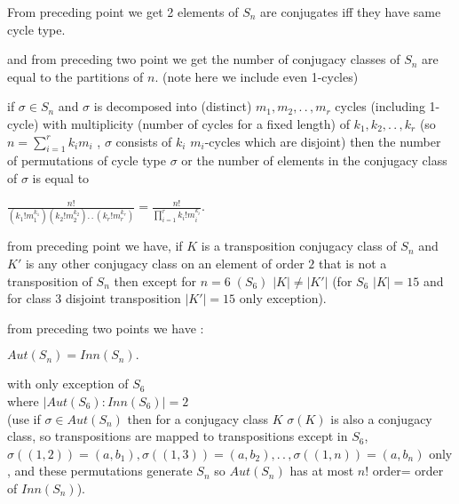 \documentclass[11pt]{extarticle}
\newcommand{\ck}{.\,.\,}
\newcommand{\tbx}[2][]{
	\begin{tcolorbox}[enhanced,breakable,size=small,colback=black!2!white,title={#1},arc is angular, arc=1.5mm,drop fuzzy shadow]
		#2
	\end{tcolorbox}
}
\begin{document}
\begin{multicols}{2}
	\tbx{From preceding point we get 2 elements of $ S_n $ are conjugates iff they have same cycle type.
	}
	\tbx{and from preceding two point we get the number of conjugacy classes of $ S_n $ are equal to the partitions of $ n .$ (note here we include even 1-cycles)
	}
	\tbx{if $ \sigma \in S_n $ and $ \sigma $ is decomposed into (distinct) $ m_1,m_2,\ck, m_r $ cycles (including 1-cycle) with multiplicity (number of cycles for a fixed length) of $ k_1,k_2,\ck , k_r $ 
		(so $ n= \sum_{i=1}^{r}k_im_i $ , $ \sigma $ consists of $ k_i $ $ m_i $-cycles which are disjoint) then the number of permutations of cycle type $ \sigma $ or the number of elements in the conjugacy class of $ \sigma $ is equal to 
		\begin{center}
			$ \frac{ n! }{(k_1!m_{1}^{k_1})(k_2!m_{2}^{k_2})\ck (k_r!m_{r}^{k_r})}=\frac{ n! }{\prod_{i=1}^{r}k_i!m_i^{k_i}} .$
		\end{center}
	}
	\tbx{from preceding point we have, if $ K $ is a transposition conjugacy class of $ S_n $ and $  K' $ is any other conjugacy class on an element of order $ 2 $ that is not a transposition of $ S_n $ then except for $ n=6 \; (S_6)$ $ |K|\neq |K'| $ (for $ S_6 $ $ |K|=15 $ and for class $ 3 $ disjoint transposition $ |K'|=15 $ only exception).
	}
		\tbx{from preceding two points we have :
		\begin{center}
			$ Aut(S_n)=Inn(S_n) .$
		\end{center} with only exception of $ S_6 $ \\ where $ |Aut(S_6):Inn(S_6)|=2 $ \\
		{ \footnotesize (use if $ \sigma \in Aut(S_n) $ then for a conjugacy class $ K $ $ \sigma(K) $ is also a conjugacy class, so transpositions are mapped to transpositions except in $ S_6 $, $ \sigma((1,2))=(a,b_1), \sigma((1,3))=(a,b_2),\ck, \sigma ((1,n))=(a,b_n)$ only , and these permutations generate $ S_n $ so $ Aut(S_n) $ has at most $ n! $ order= order of $ Inn(S_n) $).}}
		

\end{multicols}
\end{document}
